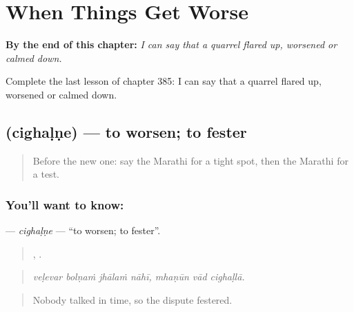 
\chapter{When Things Get Worse}
\label{ch:mr-when-things-get-worse}

\begin{chapteropening}
\textbf{By the end of this chapter:} \emph{I can say that a quarrel flared up, worsened or calmed down.}

Complete the last lesson of chapter 385: I can say that a quarrel flared up, worsened or calmed down.
\end{chapteropening}

\section[\texorpdfstring{\mr{चिघळणे} (cighaḷṇe)}{चिघळणे (cighaḷṇe)}]{ (cighaḷṇe) — to worsen; to fester}

\label{lesson:MR-C385-cighalne}



\begin{quote}
Before the new one: say the Marathi for a tight spot, then the Marathi for a test.
\end{quote}

\subsection*{You'll want to know: }
\textbf{} — \emph{cighaḷṇe} — \textquotedblleft{}to worsen; to fester\textquotedblright{}.

\begin{quote}
   ,   .
\end{quote}

\begin{quote}
\emph{veḷevar bolṇaṁ jhālaṁ nāhī, mhaṇūn vād cighaḷlā.}
\end{quote}

\begin{quote}
Nobody talked in time, so the dispute festered.
\end{quote}

